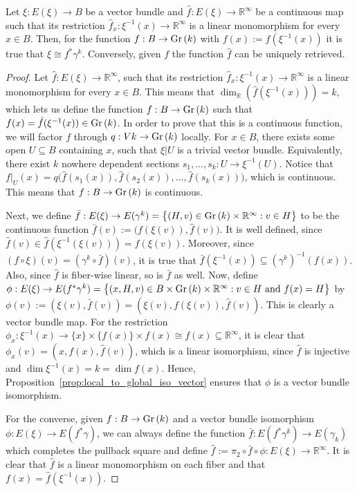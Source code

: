 \begin{lemma}\label{lem:injection_from_total_space} Let $\xi:E(\xi)\to B$ be a vector bundle and $\hat{f}:E(\xi)\to\mathbb{R}^{\infty}$ be a continuous map such that its restriction $\hat{f}_x:\xi^{-1}(x)\to\mathbb{R}^{\infty}$ is a linear monomorphism for every $x\in B$. Then, for the function $f:B\to\Gr{k}$ with $f(x):=\hat{f}(\xi^{-1}(x))$ it is true that $\xi\cong f^*\gamma^k$. Conversely, given $f$ the function $\hat{f}$ can be uniquely retrieved.
\end{lemma}
\begin{proof} Let $\hat{f}:E(\xi)\to\mathbb{R}^{\infty}$, such that its restriction $\hat{f}_x:\xi^{-1}(x)\to\mathbb{R}^{\infty}$ is a linear monomorphism for every $x\in B$. This means that $\dim_{\mathbb{R}}(\hat{f}(\xi^{-1}(x)))=k$, which lets us define the function $f:B\to\Gr{k}$ such that $f(x)=\hat{f}(\xi^{-1}(x))\in\Gr{k}$. In order to prove that this is a continuous function, we will factor $f$ through $q:V{k}\to\Gr{k}$ locally. For $x\in B$, there exists some open $U\subseteq B$ containing $x$, such that $\xi|U$ is a trivial vector bundle. Equivalently, there exist $k$ nowhere dependent sections $s_1,\ldots,s_k:U\to\xi^{-1}(U)$. Notice that $f|_U(x)=q\big(\hat{f}(s_1(x)),\hat{f}(s_2(x)),\ldots,\hat{f}(s_k(x))\big)$, which is continuous. This means that $f:B\to\Gr{k}$ is continuous.

Next, we define $\bar{f}:E(\xi)\to E(\gamma^k)=\big\{(H,v)\in\Gr{k}\times\mathbb{R}^{\infty}:v\in H\big\}$ to be the continuous function $\bar{f}(v):=\big(f(\xi(v)),\hat{f}(v)\big)$. It is well defined, since $\hat{f}(v)\in\hat{f}(\xi^{-1}(\xi(v)))=f(\xi(v))$. Moreover, since $(f\circ\xi)(v)=(\gamma^k\circ\bar{f})(v)$, it is true that $\bar{f}(\xi^{-1}(x))\subseteq(\gamma^k)^{-1}(f(x))$. Also, since $\hat{f}$ is fiber-wise linear, so is $\bar{f}$ as well. Now, define $\phi:E(\xi)\to E(f^*\gamma^k)=\big\{(x,H,v)\in B\times\Gr{k}\times\mathbb{R}^{\infty}:v\in H\text{ and }f(x)=H\big\}$ by $\phi(v):=(\xi(v),\bar{f}(v))=(\xi(v),f(\xi(v)),\hat{f}(v))$. This is clearly a vector bundle map. For the restriction $\phi_x:\xi^{-1}(x)\to\{x\}\times\{f(x)\}\times f(x)\cong f(x)\subseteq\mathbb{R}^{\infty}$, it is clear that $\phi_x(v)=(x,f(x),\hat{f}(v))$, which is a linear isomorphism, since $\hat{f}$ is injective and $\dim\xi^{-1}(x)=k=\dim f(x)$. Hence, Proposition~\ref{prop:local_to_global_iso_vector} ensures that $\phi$ is a vector bundle isomorphism.

For the converse, given $f:B\to\Gr{k}$ and a vector bundle isomorphism $\phi:E(\xi)\to E(f^*\gamma)$, we can always define the function $\bar{f}:E(f^*\gamma^k)\to E(\gamma_k)$ which completes the pullback square and define $\hat{f}:=\pi_2\circ\bar{f}\circ\phi:E(\xi)\to\mathbb{R}^{\infty}$. It is clear that $\hat{f}$ is a linear monomorphism on each fiber and that $f(x)=\hat{f}(\xi^{-1}(x))$.
\end{proof}

